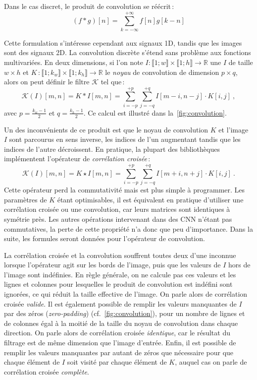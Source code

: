 Dans le cas discret, le produit de convolution se réécrit\,:
\begin{equation}
  (f * g)[n] = \sum_{k=-\infty}^{+\infty} f[n]g[k-n]
\end{equation}

Cette formulation s'intéresse cependant aux signaux 1D, tandis que les images sont des signaux 2D. La convolution discrète s'étend sans problème aux fonctions multivariées. En deux dimensions, si l'on note $I : \llbracket 1;w \rrbracket \times \llbracket 1;h \rrbracket \rightarrow \mathbb{R}$ une $I$ de taille $w\times{}h$ et $K\,: \llbracket 1;k_w \rrbracket \times \llbracket 1;k_h \rrbracket \rightarrow \mathbb{R}$ le \emph{noyau} de convolution de dimension $p \times q$, alors on peut définir le filtre $\mathcal{K}$ tel que\,:
\begin{equation}
  \mathcal{K}(I)[m,n] = K * I [m,n] = \sum_{i=-p}^{+p} \sum_{j=-q}^{+q} I[m - i, n - j] \cdot K[i, j]~,
\end{equation}
avec $p = \frac{k_w-1}{2}$ et $q = \frac{k_h-1}{2}$. Ce calcul est illustré dans la~\cref{fig:convolution}.

Un des inconvénients de ce produit est que le noyau de convolution $K$ et l'image $I$ sont parcourus en sens inverse, les indices de l'un augmentant tandis que les indices de l'autre décroissent. En pratique, la plupart des bibliothèques implémentent l'opérateur de \emph{corrélation croisée}\,:
\begin{equation}
\mathcal{K}(I)[m,n] = K \star I [m, n] = \sum_{i=-p}^{+p} \sum_{j=-q}^{+q} I[m + i, n + j] \cdot K[i, j]~.
\end{equation}
Cette opérateur perd la commutativité mais est plus simple à programmer. Les paramètres de $K$ étant optimisables, il est équivalent en pratique d'utiliser une corrélation croisée ou une convolution, car leurs matrices sont identiques à symétrie près. Les autres opérations intervenant dans des \gls{CNN} n'étant pas commutatives, la perte de cette propriété n'a donc que peu d'importance. Dans la suite, les formules seront données pour l'opérateur de convolution.

La corrélation croisée et la convolution souffrent toutes deux d'une inconnue lorsque l'opérateur agit sur les bords de l'image, puis que les valeurs de $I$ hors de l'image sont indéfinies. En règle générale, on ne calcule pas ces valeurs et les lignes et colonnes pour lesquelles le produit de convolution est indéfini sont ignorées, ce qui réduit la taille effective de l'image. On parle alors de corrélation croisée \emph{valide}. Il est également possible de remplir les valeurs manquantes de $I$ par des zéros (\emph{zero-padding}) (cf.~\cref{fig:convolution}), pour un nombre de lignes et de colonnes égal à la moitié de la taille du noyau de convolution dans chaque direction. On parle alors de corrélation croisée \emph{identique}, car le résultat du filtrage est de même dimension que l'image d'entrée. Enfin, il est possible de remplir les valeurs manquantes par autant de zéros que nécessaire pour que chaque élément de $I$ soit visité par chaque élément de $K$, auquel cas on parle de corrélation croisée \emph{complète}.

